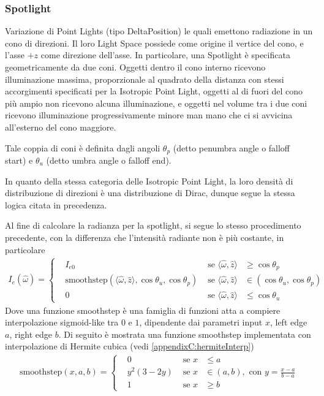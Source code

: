 \subsubsection{Spotlight}
Variazione di Point Lights (tipo DeltaPosition) le quali emettono radiazione in un cono di direzioni. Il loro Light Space possiede come origine il
vertice del cono, e l'asse $+z$ come direzione dell'asse. In particolare, una Spotlight \`e specificata geometricamente da due coni. Oggetti
dentro il cono interno ricevono illuminazione massima, proporzionale al quadrato della distanza con stessi accorgimenti specificati per la Isotropic
Point Light, oggetti al di fuori del cono pi\`u ampio non ricevono alcuna illuminazione, e oggetti nel volume tra i due coni ricevono illuminazione 
progressivamente minore man mano che ci si avvicina all'esterno del cono maggiore.\par
Tale coppia di coni \`e definita dagli angoli $\theta_p$ (detto penumbra angle o falloff start) e $\theta_u$ (detto umbra angle o falloff end).\par
In quanto della stessa categoria delle Isotropic Point Light, la loro densit\`a di distribuzione di direzioni \`e una distribuzione di Dirac, dunque
segue la stessa logica citata in precedenza.\par
Al fine di calcolare la radianza per la spotlight, si segue lo stesso procedimento precedente, con la differenza che l'intensit\`a radiante non \`e 
pi\`u costante, in particolare
\begin{align}
	I_e(\hat{\omega}) = \left\{\begin{aligned}
		&I_{e0} &\text{ se }\langle\hat{\omega},\hat{z}\rangle&\geq\cos\theta_p\\
		&\mathrm{smoothstep}(\langle\hat{\omega},\hat{z}\rangle,\cos\theta_u,\cos\theta_p)%
			&\text{ se }\langle\hat{\omega},\hat{z}\rangle&\in(\cos\theta_u,\cos\theta_p)\\
		&0 &\text{ se }\langle\hat{\omega},\hat{z}\rangle&\leq\cos\theta_u
	\end{aligned}\right.
\end{align}
Dove una funzione \textrm{smoothstep} \`e una famiglia di funzioni atta a compiere interpolazione sigmoid-like tra $0$ e $1$, dipendente dai 
parametri input $x$, left edge $a$, right edge $b$. Di seguito \`e mostrata una funzione \textrm{smoothstep} implementata con interpolazione di 
Hermite cubica (vedi \ref{appendixC:hermiteInterp})
\begin{align}
	\mathrm{smoothstep}(x,a,b)=\left\{\begin{aligned}
		&0 &\text{ se }x&\leq a\\
		&y^2(3-2y) &\text{ se }x&\in(a,b),\text{ con }y=\frac{x-a}{b-a}\\
		&1 &\text{ se }x&\geq b
	\end{aligned}\right.
\end{align}
